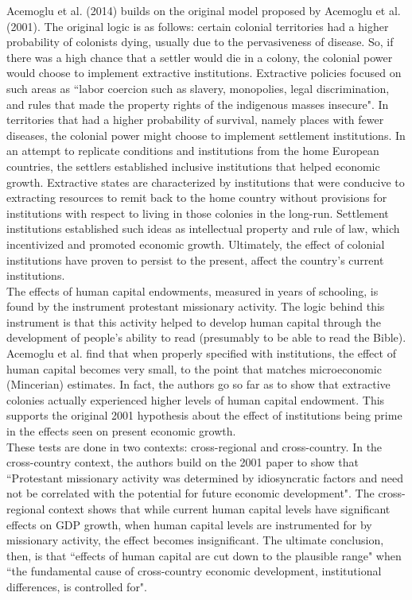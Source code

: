\documentclass[12pt]{article}
\begin{document}
{Acemoglu et al. (2014) builds on the original model proposed by Acemoglu et al. (2001). The original logic is as follows: certain colonial territories had a higher probability of colonists dying, usually due to the pervasiveness of disease. So, if there was a high chance that a settler would die in a colony, the colonial power would choose to implement extractive institutions. Extractive policies focused on such areas as ``labor coercion such as slavery, monopolies, legal discrimination, and rules that made the property rights of the indigenous masses insecure". In territories that had a higher probability of survival, namely places with fewer diseases, the colonial power might choose to implement settlement institutions. In an attempt to replicate conditions and institutions from the home European countries, the settlers established inclusive institutions that helped economic growth. Extractive states are characterized by institutions that were conducive to extracting resources to remit back to the home country without provisions for institutions with respect to living in those colonies in the long-run. Settlement institutions established such ideas as intellectual property and rule of law, which incentivized and promoted economic growth. Ultimately, the effect of colonial institutions have proven to persist to the present, affect the country's current institutions.\\

The effects of human capital endowments, measured in years of schooling, is found by the instrument protestant missionary activity. The logic behind this instrument is that this activity helped to develop human capital through the development of people’s ability to read (presumably to be able to read the Bible). Acemoglu et al. find that when properly specified with institutions, the effect of human capital becomes very small, to the point that matches microeconomic (Mincerian) estimates. In fact, the authors go so far as to show that extractive colonies actually experienced higher levels of human capital endowment. This supports the original 2001 hypothesis about the effect of institutions being prime in the effects seen on present economic growth.\\

These tests are done in two contexts: cross-regional and cross-country. In the cross-country  context, the authors build on the 2001 paper to show that ``Protestant missionary activity was determined by idiosyncratic factors and need not be correlated with the potential for future economic development". The cross-regional context shows that while current human capital levels have significant effects on GDP growth, when human capital levels are instrumented for by missionary activity, the effect becomes insignificant. The ultimate conclusion, then, is that ``effects of human capital are cut down to the plausible range" when ``the fundamental cause of cross-country economic development, institutional differences, is controlled for".\pagebreak



}
\end{document}
